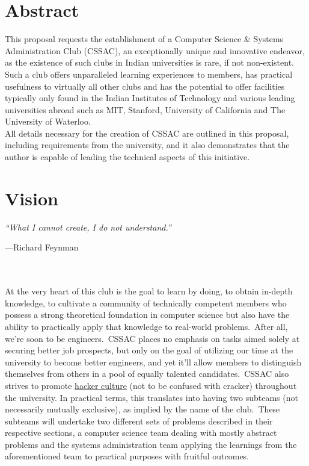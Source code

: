 

\section{Abstract}\label{sec:abstract}
This proposal requests the establishment of a Computer Science \& Systems Administration Club (CSSAC), an exceptionally
unique and innovative endeavor, as the existence of such clubs in Indian universities is rare, if not non-existent.
Such a club offers unparalleled learning experiences to members, has practical usefulness to virtually all other clubs
and has the potential to offer facilities typically only found in the Indian Institutes of Technology and various
leading universities abroad such as MIT, Stanford, University of California and The University of Waterloo.
\\
All details necessary for the creation of CSSAC are outlined in this proposal, including requirements from the
university, and it also demonstrates that the author is capable of leading the technical aspects of this initiative.




\section{Vision}\label{sec:vision}
\emph{``What I cannot create, I do not understand.''}{\par\hfill\small{---Richard Feynman}}
\\\\
At the very heart of this club is the goal to learn by doing, to obtain in-depth knowledge, to cultivate a community of
technically competent members who possess a strong theoretical foundation in computer science but also have the ability
to practically apply that knowledge to real-world problems.\ After all, we're soon to be engineers.\ CSSAC places no
emphasis on tasks aimed solely at securing better job prospects, but only on the goal of utilizing our time at the
university to become better engineers, and yet it'll allow members to distinguish themselves from others in a pool of
equally talented candidates.\ CSSAC also strives to promote
\href{https://wikipedia.org/wiki/Hacker_culture}{\color{blue}hacker culture} (not to be confused with cracker)
throughout the university.
In practical terms, this translates into having two subteams (not necessarily mutually exclusive), as implied by the
name of the club.\ These subteams will undertake two different sets of problems described in their respective sections,
a computer science team dealing with mostly abstract problems and the systems administration team applying the learnings
from the aforementioned team to practical purposes with fruitful outcomes.


